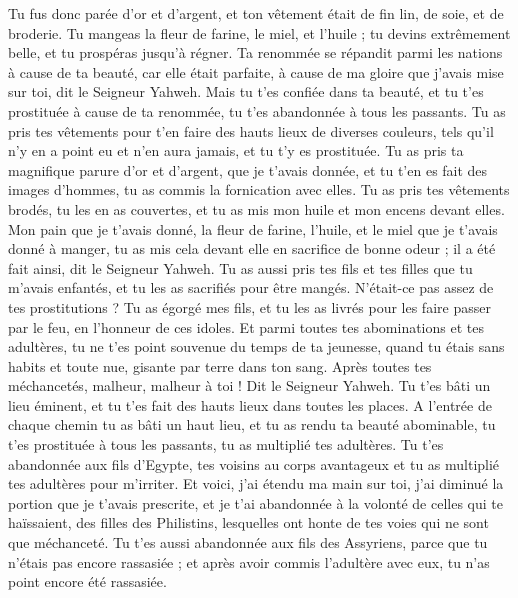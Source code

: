 \begin{multicols}{2}
Tu fus donc parée d'or et d'argent, et ton vêtement était de fin lin, de soie, et de broderie. Tu mangeas la fleur de farine, le miel, et l'huile ; tu devins extrêmement belle, et tu prospéras jusqu'à régner.
Ta renommée se répandit parmi les nations à cause de ta beauté, car elle était parfaite, à cause de ma gloire que j'avais mise sur toi, dit le Seigneur Yahweh.
Mais tu t'es confiée dans ta beauté, et tu t'es prostituée à cause de ta renommée, tu t'es abandonnée à tous les passants.
Tu as pris tes vêtements pour t'en faire des hauts lieux de diverses couleurs, tels qu'il n'y en a point eu et n'en aura jamais, et tu t'y es prostituée.
Tu as pris ta magnifique parure d'or et d'argent, que je t'avais donnée, et tu t'en es fait des images d'hommes, tu as commis la fornication avec elles.
Tu as pris tes vêtements brodés, tu les en as couvertes, et tu as mis mon huile et mon encens devant elles.
Mon pain que je t'avais donné, la fleur de farine, l'huile, et le miel que je t'avais donné à manger, tu as mis cela devant elle en sacrifice de bonne odeur ; il a été fait ainsi, dit le Seigneur Yahweh.
Tu as aussi pris tes fils et tes filles que tu m'avais enfantés, et tu les as sacrifiés pour être mangés. N'était-ce pas assez de tes prostitutions ?
Tu as égorgé mes fils, et tu les as livrés pour les faire passer par le feu, en l'honneur de ces idoles.
Et parmi toutes tes abominations et tes adultères, tu ne t'es point souvenue du temps de ta jeunesse, quand tu étais sans habits et toute nue, gisante par terre dans ton sang.
Après toutes tes méchancetés, malheur, malheur à toi ! Dit le Seigneur Yahweh.
Tu t'es bâti un lieu éminent, et tu t'es fait des hauts lieux dans toutes les places.
A l'entrée de chaque chemin tu as bâti un haut lieu, et tu as rendu ta beauté abominable, tu t'es prostituée à tous les passants, tu as multiplié tes adultères.
Tu t'es abandonnée aux fils d'Egypte, tes voisins au corps avantageux et tu as multiplié tes adultères pour m'irriter.
Et voici, j'ai étendu ma main sur toi, j'ai diminué la portion que je t'avais prescrite, et je t'ai abandonnée à la volonté de celles qui te haïssaient, des filles des Philistins, lesquelles ont honte de tes voies qui ne sont que méchanceté.
Tu t'es aussi abandonnée aux fils des Assyriens, parce que tu n'étais pas encore rassasiée ; et après avoir commis l'adultère avec eux, tu n'as point encore été rassasiée.

\end{multicols}
